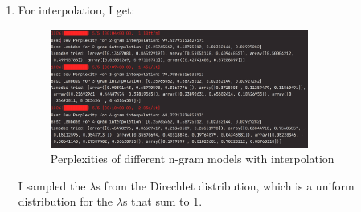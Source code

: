 \documentclass[12pt]{article}
\theoremstyle{definitionstyle}
\begin{document}
\begin{enumerate}
        \item For interpolation, I get:
        \begin{figure}[H]
            \centering
            \includegraphics[width=0.8\textwidth]{interpolationppls.png}
            \caption{Perplexities of different n-gram models with interpolation}
            \label{fig:interpolation_perplexities}
        \end{figure}
        I sampled the $\lambda$s from the Direchlet distribution, which is a uniform distribution for the $\lambda$s that sum to 1. 
    \end{enumerate}
    
\end{document}
